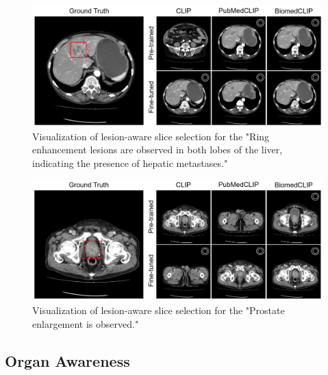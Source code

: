 \documentclass[bioengineering,article,submit,pdftex,moreauthors]{Definitions/mdpi}
\begin{document}
\begin{figure}[ht]
  \centering
  \includegraphics[width=1\textwidth]{./figures/app_lesion_aware_inst8_2.png}
  \caption{Visualization of lesion-aware slice selection for the "Ring enhancement lesions are observed in both lobes of the liver, indicating the presence of hepatic metastases."}
  \label{fig:lesion_aware_inst8}
\end{figure}


\begin{figure}[ht]
  \centering
  \includegraphics[width=1\textwidth]{./figures/app_lesion_aware_inst10_2.png}
  \caption{Visualization of lesion-aware slice selection for the  "Prostate enlargement is observed."}
  \label{fig:lesion_aware_inst10}
\end{figure}


\clearpage


\subsection{Organ Awareness}
\end{document}
